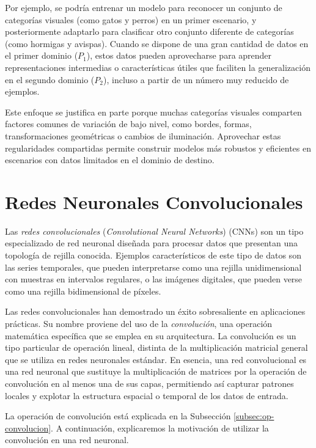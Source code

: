 Por ejemplo, se podría entrenar un modelo para reconocer un conjunto de categorías visuales (como gatos y perros) en un primer escenario, y posteriormente adaptarlo para clasificar otro conjunto diferente de categorías (como hormigas y avispas). Cuando se dispone de una gran cantidad de datos en el primer dominio ($P_1$), estos datos pueden aprovecharse para aprender representaciones intermedias o características útiles que faciliten la generalización en el segundo dominio ($P_2$), incluso a partir de un número muy reducido de ejemplos.

Este enfoque se justifica en parte porque muchas categorías visuales comparten factores comunes de variación de bajo nivel, como bordes, formas, transformaciones geométricas o cambios de iluminación. Aprovechar estas regularidades compartidas permite construir modelos más robustos y eficientes en escenarios con datos limitados en el dominio de destino.



\section{Redes Neuronales Convolucionales}

Las \emph{redes convolucionales} (\emph{Convolutional Neural Networks}) (CNNs) \parencite{Goodfellow-et-al-2016} son un tipo especializado de red neuronal diseñada para procesar datos que presentan una topología de rejilla conocida. Ejemplos característicos de este tipo de datos son las series temporales, que pueden interpretarse como una rejilla unidimensional con muestras en intervalos regulares, o las imágenes digitales, que pueden verse como una rejilla bidimensional de píxeles.

Las redes convolucionales han demostrado un éxito sobresaliente en aplicaciones prácticas. Su nombre proviene del uso de la \emph{convolución}, una operación matemática específica que se emplea en su arquitectura. La convolución es un tipo particular de operación lineal, distinta de la multiplicación matricial general que se utiliza en redes neuronales estándar. En esencia, una red convolucional es una red neuronal que sustituye la multiplicación de matrices por la operación de convolución en al menos una de sus capas, permitiendo así capturar patrones locales y explotar la estructura espacial o temporal de los datos de entrada.

La operación de convolución está explicada en la Subsección \ref{subsec:op-convolucion}. A continuación, explicaremos la motivación de utilizar la convolución en una red neuronal. 


